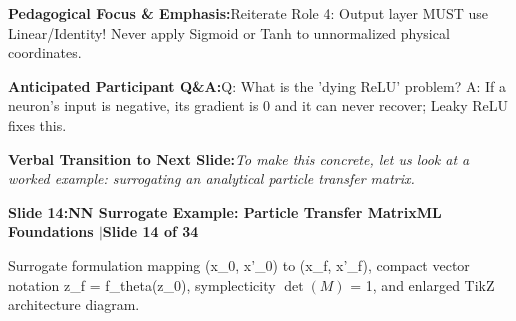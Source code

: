 \documentclass[11pt,a4paper]{article}
\begin{document}
\begin{tcolorbox}[colback=lightbg,colframe=bordergray,left=6pt,right=6pt,top=3pt,bottom=3pt,boxrule=0.6pt,arc=2.5pt]
\small
\noindent\textbf{\color{navy}Pedagogical Focus \& Emphasis:}\enspace Reiterate Role 4: Output layer MUST use Linear/Identity! Never apply Sigmoid or Tanh to unnormalized physical coordinates.\par\vspace{0.3em}
\noindent\textbf{\color{successgreen}Anticipated Participant Q\&A:}\enspace Q: What is the 'dying ReLU' problem? A: If a neuron's input is negative, its gradient is 0 and it can never recover; Leaky ReLU fixes this.\par\vspace{0.3em}
\noindent\textbf{\color{accent}Verbal Transition to Next Slide:}\enspace \emph{To make this concrete, let us look at a worked example: surrogating an analytical particle transfer matrix.}
\end{tcolorbox}
\clearpage
\hypertarget{slide.14}{}
{}
\noindent\begin{tcolorbox}[colback=navy,colframe=navy,left=6pt,right=6pt,top=3pt,bottom=3pt,boxrule=0pt,arc=2pt]
{\large\bfseries\color{white}Slide 14:\enspace NN Surrogate Example: Particle Transfer Matrix}\hfill{\footnotesize\bfseries\color{white!85!lightbg}ML Foundations \enspace$|$\enspace Slide 14 of 34}
\end{tcolorbox}
\vspace{0.2em}
\begin{tcolorbox}[colback=lightbg,colframe=bordergray,title={\footnotesize\bfseries\color{darkgray}Slide Visual Blueprint},fontupper=\small,left=6pt,right=6pt,top=2.5pt,bottom=2.5pt,boxrule=0.6pt,arc=2.5pt]
Surrogate formulation mapping (x\_0, x'\_0) to (x\_f, x'\_f), compact vector notation z\_f = f\_theta(z\_0), symplecticity $\det(M)$ = 1, and enlarged TikZ architecture diagram.
\end{tcolorbox}
\vspace{0.2em}
\end{document}
